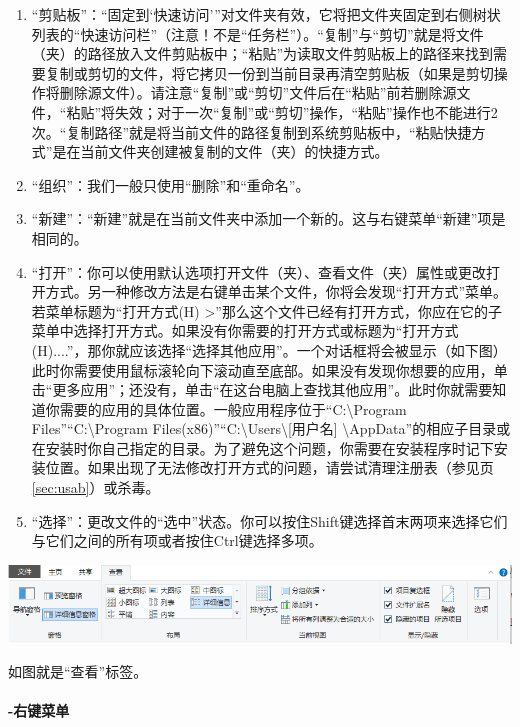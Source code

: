 \begin{enumerate}
	\item “剪贴板”：“固定到‘快速访问’”对文件夹有效，它将把文件夹固定到右侧树状列表的“快速访问栏”（注意！不是“任务栏”）。“复制”与“剪切”就是将文件（夹）的{\color{red}路径}放入文件剪贴板中；“粘贴”为读取文件剪贴板上的路径来找到需要复制或剪切的文件，将它拷贝一份到当前目录再清空剪贴板（如果是剪切操作将删除源文件）。请注意“复制”或“剪切”文件后在“粘贴”前若删除源文件，“粘贴”将失效；对于一次“复制”或“剪切”操作，“粘贴”操作也不能进行2次。“复制路径”就是将当前文件的路径复制到系统剪贴板中，“粘贴快捷方式”是在当前文件夹创建被复制的文件（夹）的快捷方式。
	\item “组织”：我们一般只使用“删除”和“重命名”。
	\item “新建”：“新建”就是在当前文件夹中添加一个新的。这与右键菜单“新建”项是相同的。
	\item “打开”：你可以使用默认选项打开文件（夹）、查看文件（夹）属性或更改打开方式。另一种修改方法是右键单击某个文件，你将会发现“打开方式”菜单。若菜单标题为“打开方式(H)    >”那么这个文件已经有打开方式，你应在它的子菜单中选择打开方式。如果没有你需要的打开方式或标题为“打开方式(H)....”，那你就应该选择“选择其他应用”。一个对话框将会被显示（如下图）此时你需要使用鼠标滚轮向下滚动直至底部。如果没有发现你想要的应用，单击“更多应用”；还没有，单击“在这台电脑上查找其他应用”。此时你就需要知道你需要的应用的具体位置。一般应用程序位于“C:\textbackslash Program Files”“C:\textbackslash Program Files(x86)”“C:\textbackslash Users\textbackslash [用户名] \textbackslash AppData”的相应子目录或在安装时你自己指定的目录。{\color{red}为了避免这个问题，你需要在安装程序时记下安装位置。}如果出现了无法修改打开方式的问题，请尝试清理注册表（参见\pageref{sec:usab}页\ref{sec:usab}）或杀毒。
	\item “选择”：更改文件的“选中”状态。你可以按住Shift键选择首末两项来选择它们与它们之间的所有项或者按住Ctrl键选择多项。
\end{enumerate}\par
\begin{center}
	\includegraphics[scale=0.4]{pic/Exp2}
\end{center} \par
如图就是“查看”标签。
\paragraph{-右键菜单}

